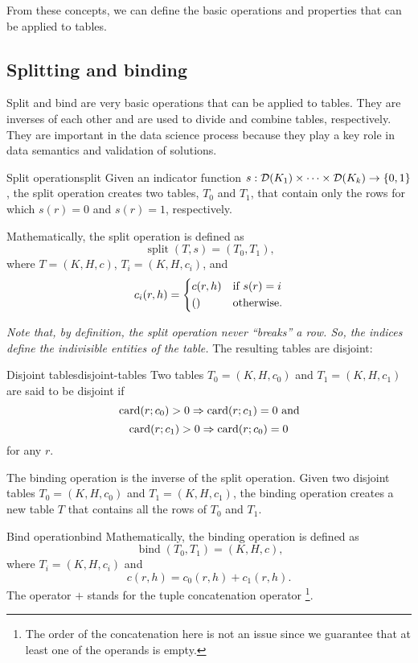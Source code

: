 From these concepts, we can define the basic operations and properties that can be applied
to tables.

\subsection{Splitting and binding}

Split and bind are very basic operations that can be applied to tables.  They are
inverses of each other and are used to divide and combine tables, respectively.
They are important in the data science process because they play a key role in
data semantics and validation of solutions.

\begin{defbox}{Split operation}{split}
Given an indicator function $s : \domainof{K_1} \times \dots \times \domainof{K_k} \to
\left\{0, 1\right\}$, the split operation creates two tables, $T_0$ and $T_1$, that
contain only the rows for which
$s(r) = 0$ and $s(r) = 1$, respectively.

Mathematically, the split operation is defined as \[
  \operatorname{split}(T, s) = \left(T_0, T_1\right)\text{,}
\] where $T = (K, H, c)$, $T_i = (K, H, c_i)$, and \[
  c_i(r, h) = \begin{dcases}
    c(r, h) & \text{if } s(r) = i \\
    () & \text{otherwise.}
  \end{dcases}
\]
\end{defbox}

\emph{Note that, by definition, the split operation never ``breaks'' a row.  So, the
indices define the indivisible entities of the table.}  The resulting tables are
disjoint:

\begin{defbox}{Disjoint tables}{disjoint-tables}
  Two tables $T_0 = (K, H, c_0)$ and $T_1 = (K, H, c_1)$ are said to be disjoint if
  $$\rowcard[r; c_0] > 0 \Rightarrow \rowcard[r; c_1] = 0\text{ and}$$
  $$\rowcard[r; c_1] > 0 \Rightarrow \rowcard[r; c_0] = 0$$ for any $r$.
\end{defbox}

The binding operation is the inverse of the split operation.  Given two disjoint tables
$T_0 = (K, H, c_0)$ and $T_1 = (K, H, c_1)$, the binding operation creates a new table $T$
that contains all the rows of $T_0$ and $T_1$.

\begin{defbox}{Bind operation}{bind}
  Mathematically, the binding operation is defined as \[
    \operatorname{bind}(T_0, T_1) = (K, H, c)\text{,}
  \] where $T_i = (K, H, c_i)$ and \[ c(r, h) = c_0(r, h) + c_1(r, h)\text{.} \]
  The operator $+$ stands for the tuple concatenation operator%
  \footnote{The order of the concatenation here is not an issue since we guarantee
  that at least one of the operands is empty.}.
\end{defbox}

